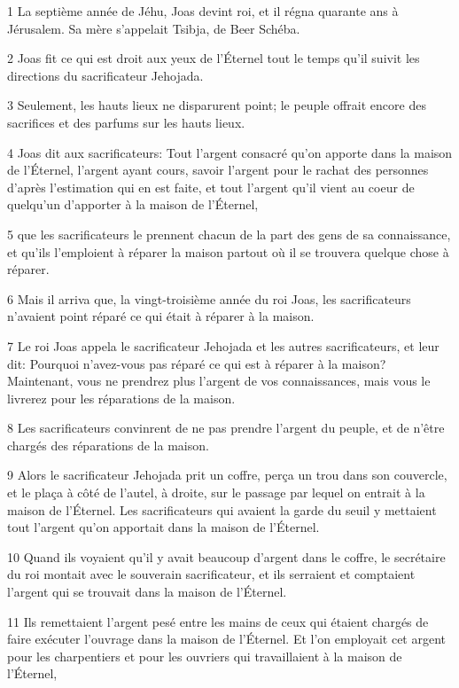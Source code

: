 \par 1 La septième année de Jéhu, Joas devint roi, et il régna quarante ans à Jérusalem. Sa mère s'appelait Tsibja, de Beer Schéba.
\par 2 Joas fit ce qui est droit aux yeux de l'Éternel tout le temps qu'il suivit les directions du sacrificateur Jehojada.
\par 3 Seulement, les hauts lieux ne disparurent point; le peuple offrait encore des sacrifices et des parfums sur les hauts lieux.
\par 4 Joas dit aux sacrificateurs: Tout l'argent consacré qu'on apporte dans la maison de l'Éternel, l'argent ayant cours, savoir l'argent pour le rachat des personnes d'après l'estimation qui en est faite, et tout l'argent qu'il vient au coeur de quelqu'un d'apporter à la maison de l'Éternel,
\par 5 que les sacrificateurs le prennent chacun de la part des gens de sa connaissance, et qu'ils l'emploient à réparer la maison partout où il se trouvera quelque chose à réparer.
\par 6 Mais il arriva que, la vingt-troisième année du roi Joas, les sacrificateurs n'avaient point réparé ce qui était à réparer à la maison.
\par 7 Le roi Joas appela le sacrificateur Jehojada et les autres sacrificateurs, et leur dit: Pourquoi n'avez-vous pas réparé ce qui est à réparer à la maison? Maintenant, vous ne prendrez plus l'argent de vos connaissances, mais vous le livrerez pour les réparations de la maison.
\par 8 Les sacrificateurs convinrent de ne pas prendre l'argent du peuple, et de n'être chargés des réparations de la maison.
\par 9 Alors le sacrificateur Jehojada prit un coffre, perça un trou dans son couvercle, et le plaça à côté de l'autel, à droite, sur le passage par lequel on entrait à la maison de l'Éternel. Les sacrificateurs qui avaient la garde du seuil y mettaient tout l'argent qu'on apportait dans la maison de l'Éternel.
\par 10 Quand ils voyaient qu'il y avait beaucoup d'argent dans le coffre, le secrétaire du roi montait avec le souverain sacrificateur, et ils serraient et comptaient l'argent qui se trouvait dans la maison de l'Éternel.
\par 11 Ils remettaient l'argent pesé entre les mains de ceux qui étaient chargés de faire exécuter l'ouvrage dans la maison de l'Éternel. Et l'on employait cet argent pour les charpentiers et pour les ouvriers qui travaillaient à la maison de l'Éternel,
